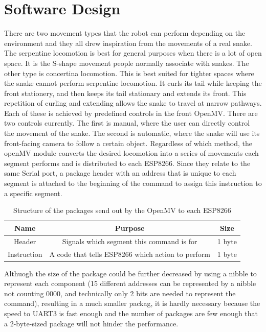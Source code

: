 \documentclass[twoside]{article}
\begin{document}
\section{Software Design}
There are two movement types that the robot can perform depending on the environment and they all drew inspiration from the movements of a real snake. The serpentine locomotion is best for general purposes when there is a lot of open space. It is the S-shape movement people normally associate with snakes. The other type is concertina locomotion. This is best suited for tighter spaces where the snake cannot perform serpentine locomotion. It curls its tail while keeping the front stationery, and then keeps its tail stationary and extends its front. This repetition of curling and extending allows the snake to travel at narrow pathways. Each of these is achieved by predefined controls in the front OpenMV. There are two controls currently. The first is manual, where the user can directly control the movement of the snake. The second is automatic, where the snake will use its front-facing camera to follow a certain object. Regardless of which method, the openMV module converts the desired locomotion into a series of movements each segment performs and is distributed to each ESP8266. Since they relate to the same Serial port, a package header with an address that is unique to each segment is attached to the beginning of the command to assign this instruction to a specific segment. 

\begin{table}[H]
\centering
\begin{tabular}{|c|c|c|}
\hline
Name & Purpose & Size \\\hline
Header & Signals which segment this command is for & 1 byte\\\hline
Instruction & A code that tells ESP8266 which action to perform & 1 byte\\\hline
\end{tabular}
\caption{Structure of the packages send out by the OpenMV to each ESP8266}
\end{table}

Althuogh the size of the package could be further decreased by using a nibble to represent each component (15 different addresses can be represented by a nibble not counting 0000, and technically only 2 bits are needed to represent the command), resulting in a much smaller packag, it is hardly necessary because the speed to UART3 is fast enough and the number of packages are few enough that a 2-byte-sized package will not hinder the performance. 
\end{document}
